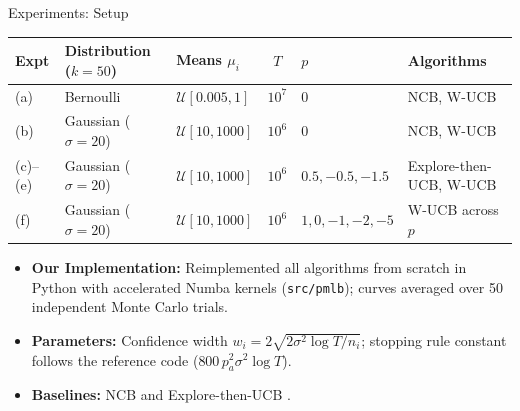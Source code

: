 \documentclass[11pt]{beamer}
\begin{document}
\begin{frame}{Experiments: Setup}
  \scriptsize
  \centering
  \setlength{\tabcolsep}{2.8pt}
  \renewcommand{\arraystretch}{1.15}
  \begin{tabular}{lllcll}
    \toprule
    Expt & Distribution ($k=50$) & Means $\mu_i$ & $T$ & $p$ & Algorithms \\
    \midrule
    (a) & Bernoulli & $\mathcal{U}[0.005, 1]$ & $10^7$ & $0$ & NCB, W-UCB \\
    (b) & Gaussian ($\sigma{=}20$) & $\mathcal{U}[10, 1000]$ & $10^6$ & $0$ & NCB, W-UCB \\
    (c)--(e) & Gaussian ($\sigma{=}20$) & $\mathcal{U}[10, 1000]$ & $10^6$ & $0.5, -0.5, -1.5$ & Explore-then-UCB, W-UCB \\
    (f) & Gaussian ($\sigma{=}20$) & $\mathcal{U}[10, 1000]$ & $10^6$ & $1, 0, -1, -2, -5$ & W-UCB across $p$ \\
    \bottomrule
  \end{tabular}

  \vspace{8pt}
  \raggedright
  \small
  \begin{itemize}
    \item \textbf{Our Implementation:} Reimplemented all algorithms from scratch in Python with accelerated Numba kernels (\texttt{src/pmlb}); curves averaged over 50 independent Monte Carlo trials.
    \item \textbf{Parameters:} Confidence width $w_i = 2\sqrt{2\sigma^2\log T/n_i}$; stopping rule constant follows the reference code ($800\,p_a^2\sigma^2\log T$).
    \item \textbf{Baselines:} NCB \cite{barman2023} and Explore-then-UCB \cite{krishna2025}.
  \end{itemize}
\end{frame}
\end{document}
